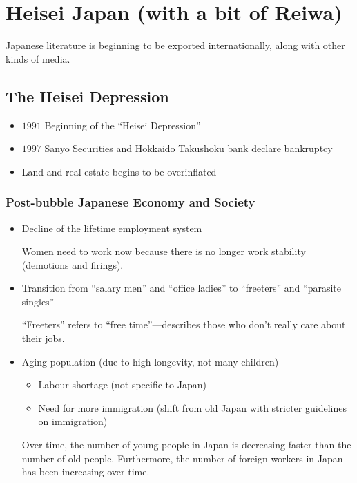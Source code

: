 \documentclass[class=article, crop=false]{standalone}
\begin{document}
  \section{Heisei Japan (with a bit of Reiwa)}
  Japanese literature is beginning to be exported internationally, along with other kinds of media.
  \subsection{The Heisei Depression}
  \begin{itemize}
    \item $1991$ Beginning of the ``Heisei Depression''
    \item $1997$ Sany\=o Securities and Hokkaid\=o Takushoku bank declare bankruptcy
    \item Land and real estate begins to be overinflated
  \end{itemize}
  \subsubsection{Post-bubble Japanese Economy and Society}
  \begin{itemize}
    \item Decline of the lifetime employment system
    \begin{note}{}
      Women need to work now because there is no longer work stability (demotions and firings).
    \end{note}
    \item Transition from ``salary men'' and ``office ladies'' to ``freeters'' and ``parasite singles''
    \begin{note}{}
      ``Freeters'' refers to ``free time''---describes those who don't really care about their jobs.
    \end{note}
    \item Aging population (due to high longevity, not many children)
    \begin{itemize}
      \item Labour shortage (not specific to Japan)
      \item Need for more immigration (shift from old Japan with stricter guidelines on immigration)
    \end{itemize}
    \begin{note}{}
      Over time, the number of young people in Japan is decreasing faster than the number of old people. Furthermore, the number of foreign workers in Japan has been increasing over time.
    \end{note}
  \end{itemize}
\end{document}
